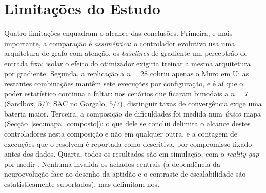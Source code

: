 \documentclass[final,5p,times,twocolumn,authoryear]{elsarticle}
\begin{document}
\section{Limitações do Estudo}
\label{sec:limitacoes}
 Quatro limitações enquadram o alcance das conclusões. Primeira, e mais importante, a
comparação é \emph{assimétrica}: o controlador evolutivo usa uma arquitetura de
grafo com atenção, os \emph{baselines} de gradiente um perceptrão de entrada fixa;
isolar o efeito do otimizador exigiria treinar a mesma arquitetura por gradiente.
Segunda, a replicação a $n=28$ cobriu apenas o Muro em U: as restantes
combinações mantêm sete execuções por configuração, e é aí que o poder
estatístico continua a faltar: nos cenários que ficaram bimodais a $n=7$
(Sandbox, $5/7$; SAC no Gargalo, $5/7$), distinguir taxas de convergência exige
uma bateria maior. Terceira, a composição de dificuldades foi medida num
\emph{único} mapa (Secção~\ref{sec:mapa_composto}): o que dele se conclui delimita
o alcance destes controladores nesta composição e não em qualquer outra, e a
contagem de execuções que o resolvem é reportada como descritiva, por compromisso
fixado antes dos dados. Quarta, todos os
resultados são em simulação, com o \emph{reality gap} por medir
\citep{tobin2017domain}. Nenhuma invalida os achados centrais (a dependência da
neuroevolução face ao desenho da aptidão e o contraste de escalabilidade são
estatisticamente suportados), mas delimitam-nos.
\end{document}
